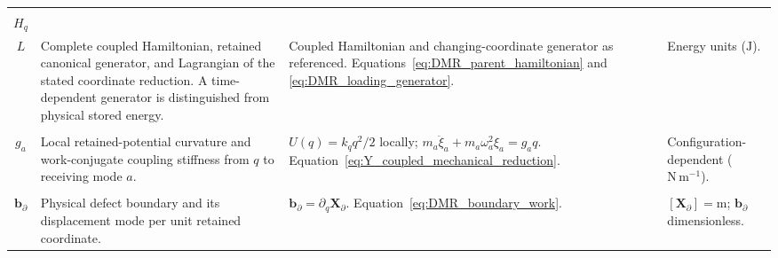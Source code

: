 \begin{longtable}{@{} c p{5.5cm} p{4cm} p{3.5cm} @{}}
\begin{tabular}[c]{@{}c@{}}$H$ \\ $H_q$ \\ $L$\end{tabular} & {\raggedright Complete coupled Hamiltonian, retained canonical generator, and Lagrangian of the stated coordinate reduction. A time-dependent generator is distinguished from physical stored energy.\par} & {\raggedright Coupled Hamiltonian and changing-coordinate generator as referenced. \newline Equations~\eqref{eq:DMR_parent_hamiltonian} and \eqref{eq:DMR_loading_generator}.\par} & {\raggedright Energy units ($\mathrm J$).\par} \\

\begin{tabular}[c]{@{}c@{}}$k_q$ \\ $g_a$\end{tabular} & {\raggedright Local retained-potential curvature and work-conjugate coupling stiffness from $q$ to receiving mode $a$.\par} & {\raggedright $U(q)=k_qq^2/2$ locally; $m_a\ddot\xi_a+m_a\omega_a^2\xi_a=g_aq$. \newline Equation~\eqref{eq:Y_coupled_mechanical_reduction}.\par} & {\raggedright Configuration-dependent ($\mathrm{N\,m^{-1}}$).\par} \\

\begin{tabular}[c]{@{}c@{}}$\mathbf X_\partial$ \\ $\mathbf b_\partial$\end{tabular} & {\raggedright Physical defect boundary and its displacement mode per unit retained coordinate.\par} & {\raggedright $\mathbf b_\partial=\partial_q\mathbf X_\partial$. \newline Equation~\eqref{eq:DMR_boundary_work}.\par} & {\raggedright $[\mathbf X_\partial]=\mathrm m$; $\mathbf b_\partial$ dimensionless.\par} \\


\end{longtable}
